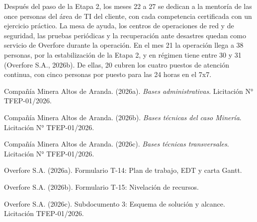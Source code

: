 \documentclass[formulario]{../../comun/overfore}
\begin{document}
Después del paso de la Etapa 2, los meses 22 a 27 se dedican a la mentoría de las once personas del área de TI del cliente, con cada competencia certificada con un ejercicio práctico. La mesa de ayuda, los centros de operaciones de red y de seguridad, las pruebas periódicas y la recuperación ante desastres quedan como servicio de Overfore durante la operación. En el mes 21 la operación llega a 38 personas, por la estabilización de la Etapa 2, y en régimen tiene entre 30 y 31 (Overfore S.A., 2026b). De ellas, 20 cubren los cuatro puestos de atención continua, con cinco personas por puesto para las 24 horas en el 7x7.

\begin{referencias}
\item Compañía Minera Altos de Aranda. (2026a). \emph{Bases administrativas}. Licitación N° TFEP-01/2026.
\item Compañía Minera Altos de Aranda. (2026b). \emph{Bases técnicas del caso Minería}. Licitación N° TFEP-01/2026.
\item Compañía Minera Altos de Aranda. (2026c). \emph{Bases técnicas transversales}. Licitación N° TFEP-01/2026.
\item Overfore S.A. (2026a). Formulario T-14: Plan de trabajo, EDT y carta Gantt.
\item Overfore S.A. (2026b). Formulario T-15: Nivelación de recursos.
\item Overfore S.A. (2026c). Subdocumento 3: Esquema de solución y alcance. Licitación TFEP-01/2026.
\end{referencias}
\end{document}
